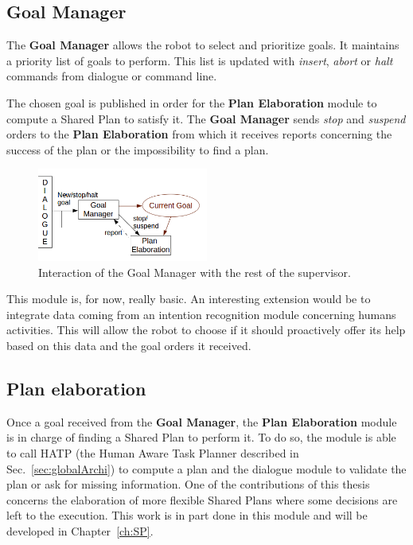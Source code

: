 \documentclass[english,a4paper,11pt,twoside]{StyleThese}
\begin{document}
\subsection{Goal Manager}

The \textbf{Goal Manager} allows the robot to select and prioritize goals. It maintains a priority list of goals to perform. This list is updated with \textit{insert}, \textit{abort} or \textit{halt} commands from dialogue or command line.

The chosen goal is published in order for the \textbf{Plan Elaboration} module to compute a Shared Plan to satisfy it. The \textbf{Goal Manager} sends \textit{stop} and \textit{suspend} orders to the \textbf{Plan Elaboration} from which it receives reports concerning the success of the plan or the impossibility to find a plan.

\begin{figure}[!h]
	\centering
    \includegraphics[width=0.5\textwidth]{figs/Chapter2/GoalManager.png}
    \caption{Interaction of the Goal Manager with the rest of the supervisor.}
    \label{fig:goalManager}
\end{figure}

This module is, for now, really basic. An interesting extension would be to integrate data coming from an intention recognition module concerning humans activities. This will allow the robot to choose if it should proactively offer its help based on this data and the goal orders it received. 

\subsection{Plan elaboration}

Once a goal received from the \textbf{Goal Manager}, the \textbf{Plan Elaboration} module is in charge of finding a Shared Plan to perform it. To do so, the module is able to call HATP (the Human Aware Task Planner described in Sec.~\ref{sec:globalArchi}) to compute a plan and the dialogue module to validate the plan or ask for missing information. One of the contributions of this thesis concerns the elaboration of more flexible Shared Plans where some decisions are left to the execution. This work is in part done in this module and will be developed in Chapter~\ref{ch:SP}.
\end{document}
